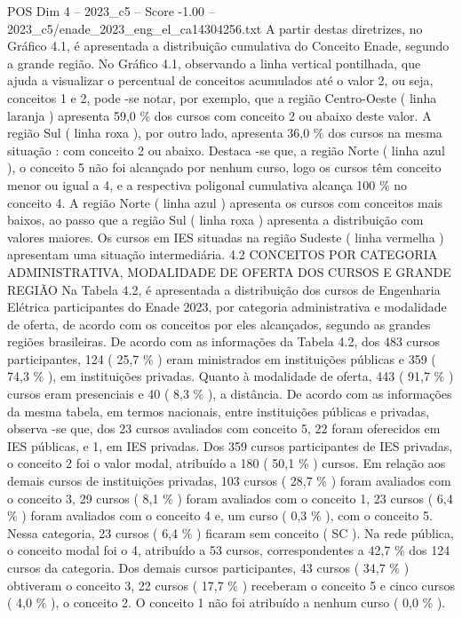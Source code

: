\begin{textsample}{POS Dim 4 – 2023\_c5 – Score -1.00 – 2023\_c5/enade\_2023\_eng\_el\_ca14304256.txt}
A partir destas diretrizes, no Gráfico 4.1, é apresentada a distribuição cumulativa do Conceito Enade, segundo a grande região.
No Gráfico 4.1, observando a linha vertical pontilhada, que ajuda a visualizar o percentual de conceitos acumulados até o valor 2, ou seja, conceitos 1 e 2, pode -se notar, por exemplo, que a região Centro-Oeste ( linha laranja ) apresenta 59,0 \% dos cursos com conceito 2 ou abaixo deste valor.
A região Sul ( linha roxa ), por outro lado, apresenta 36,0 \% dos cursos na mesma situação : com conceito 2 ou abaixo.
Destaca -se que, a região Norte ( linha azul ), o conceito 5 não foi alcançado por nenhum curso, logo os cursos têm conceito menor ou igual a 4, e a respectiva poligonal cumulativa alcança 100 \% no conceito 4.
A região Norte ( linha azul ) apresenta os cursos com conceitos mais baixos, ao passo que a região Sul ( linha roxa ) apresenta a distribuição com valores maiores.
Os cursos em IES situadas na região Sudeste ( linha vermelha ) apresentam uma situação intermediária. 4.2 CONCEITOS POR CATEGORIA ADMINISTRATIVA, MODALIDADE DE OFERTA DOS CURSOS E GRANDE REGIÃO Na Tabela 4.2, é apresentada a distribuição dos cursos de Engenharia Elétrica participantes do Enade 2023, por categoria administrativa e modalidade de oferta, de acordo com os conceitos por eles alcançados, segundo as grandes regiões brasileiras.
De acordo com as informações da Tabela 4.2, dos 483 cursos participantes, 124 ( 25,7 \% ) eram ministrados em instituições públicas e 359 ( 74,3 \% ), em instituições privadas.
Quanto à modalidade de oferta, 443 ( 91,7 \% ) cursos eram presenciais e 40 ( 8,3 \% ), a distância.
De acordo com as informações da mesma tabela, em termos nacionais, entre instituições públicas e privadas, observa -se que, dos 23 cursos avaliados com conceito 5, 22 foram oferecidos em IES públicas, e 1, em IES privadas.
Dos 359 cursos participantes de IES privadas, o conceito 2 foi o valor modal, atribuído a 180 ( 50,1 \% ) cursos.
Em relação aos demais cursos de instituições privadas, 103 cursos ( 28,7 \% ) foram avaliados com o conceito 3, 29 cursos ( 8,1 \% ) foram avaliados com o conceito 1, 23 cursos ( 6,4 \% ) foram avaliados com o conceito 4 e, um curso ( 0,3 \% ), com o conceito 5.
Nessa categoria, 23 cursos ( 6,4 \% ) ficaram sem conceito ( SC ).
Na rede pública, o conceito modal foi o 4, atribuído a 53 cursos, correspondentes a 42,7 \% dos 124 cursos da categoria.
Dos demais cursos participantes, 43 cursos ( 34,7 \% ) obtiveram o conceito 3, 22 cursos ( 17,7 \% ) receberam o conceito 5 e cinco cursos ( 4,0 \% ), o conceito 2.
O conceito 1 não foi atribuído a nenhum curso ( 0,0 \% ).

\end{textsample}
